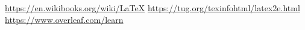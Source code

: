 \begin{thebibliography}{0}
    \label{thebibliography}
               \url{https://en.wikibooks.org/wiki/LaTeX}
     \url{https://tug.org/texinfohtml/latex2e.html}
           \url{https://www.overleaf.com/learn}
\end{thebibliography}

